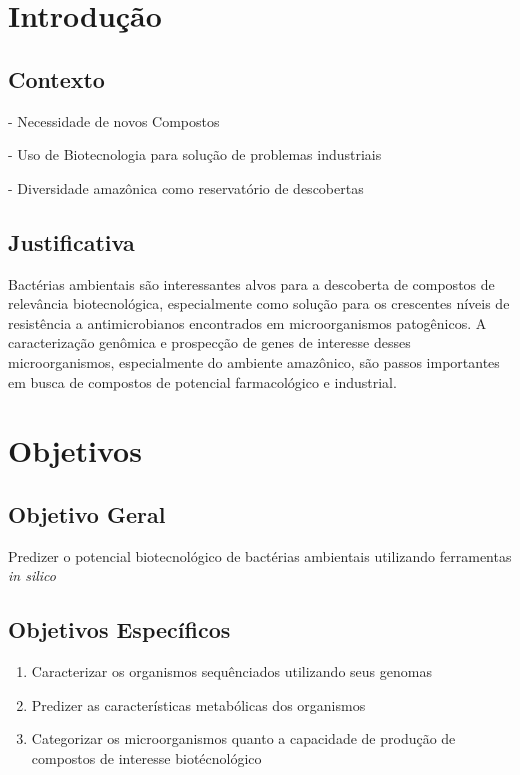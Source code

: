 \chapter{Introdução}
\label{cap:introducao}

\section{Contexto}

- Necessidade de novos Compostos

- Uso de Biotecnologia para solução de problemas industriais

- Diversidade amazônica como reservatório de descobertas


\section{Justificativa}
Bactérias ambientais são interessantes alvos para a descoberta de compostos
de relevância biotecnológica, especialmente como solução para os crescentes níveis
de resistência a antimicrobianos encontrados em microorganismos patogênicos.
A caracterização genômica e prospecção de genes de interesse desses microorganismos,
especialmente do ambiente amazônico, são passos importantes
em busca de compostos de potencial farmacológico e industrial.

\chapter{Objetivos}

\section{Objetivo Geral}

Predizer o potencial biotecnológico de bactérias ambientais utilizando 
ferramentas \textit{in silico} 

\section{Objetivos Específicos}
\begin{enumerate}
    \item Caracterizar os organismos sequênciados utilizando seus genomas
    \item Predizer as características metabólicas dos organismos
    \item Categorizar os microorganismos quanto a capacidade de produção de compostos de interesse biotécnológico
\end{enumerate}





